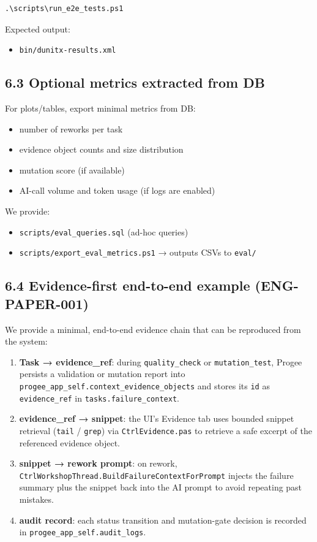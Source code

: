 \documentclass[11pt]{article}
\begin{document}
\begin{verbatim}
.\scripts\run_e2e_tests.ps1
\end{verbatim}

Expected output:
\begin{itemize}
\item \texttt{bin/dunitx-results.xml}
\end{itemize}

\subsection{6.3 Optional metrics extracted from DB}
For plots/tables, export minimal metrics from DB:
\begin{itemize}
\item number of reworks per task
\item evidence object counts and size distribution
\item mutation score (if available)
\item AI-call volume and token usage (if logs are enabled)
\end{itemize}

We provide:
\begin{itemize}
\item \texttt{scripts/eval\_queries.sql} (ad-hoc queries)
\item \texttt{scripts/export\_eval\_metrics.ps1} → outputs CSVs to \texttt{eval/}
\end{itemize}
\subsection{6.4 Evidence-first end-to-end example (ENG-PAPER-001)}
We provide a minimal, end-to-end evidence chain that can be reproduced from the system:
\begin{enumerate}
\item \textbf{Task → evidence\_ref}: during \texttt{quality\_check} or \texttt{mutation\_test}, Progee persists a validation or mutation report into \texttt{progee\_app\_self.context\_evidence\_objects} and stores its \texttt{id} as \texttt{evidence\_ref} in \texttt{tasks.failure\_context}.
\item \textbf{evidence\_ref → snippet}: the UI’s Evidence tab uses bounded snippet retrieval (\texttt{tail} / \texttt{grep}) via \texttt{CtrlEvidence.pas} to retrieve a safe excerpt of the referenced evidence object.
\item \textbf{snippet → rework prompt}: on rework, \texttt{CtrlWorkshopThread.BuildFailureContextForPrompt} injects the failure summary plus the snippet back into the AI prompt to avoid repeating past mistakes.
\item \textbf{audit record}: each status transition and mutation-gate decision is recorded in \texttt{progee\_app\_self.audit\_logs}.
\end{enumerate}
\end{document}
